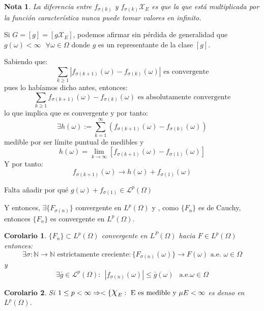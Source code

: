 \documentclass[11pt, a4paper]{article}
\makeatletter
\newif\IfInSansMode
\let\oldsf\sffamily
\renewcommand*{\sffamily}{\oldsf\mathversion{sans}\InSansModetrue}
\let\oldnorm\normalfont
\renewcommand*{\normalfont}{\oldnorm\InSansModefalse\mathversion{normal}}
\DeclareRobustCommand{\rchi}{{\Large \mathpalette\irchi\relax}}
\newcommand{\irchi}[2]{\raisebox{0.4\depth}{$#1\chi$}} %
\renewenvironment{proof}[1][\proofname] {\par\pushQED{\qed}\normalfont\topsep6\p@\@plus6\p@\relax\trivlist\item[\hskip\labelsep\itshape\sffamily#1\@addpunct{.}]\ignorespaces}{\popQED\endtrivlist\@endpefalse}
\theoremstyle{theorem-style}
\newtheorem{ncor}{Corolario}[section]
\theoremstyle{definition-style}
\theoremstyle{remark-style}
\newtheorem*{nota}{Nota}
\theoremstyle{example-style}
\makeatother
\begin{document}
\begin{proof}
  \begin{nota}
    La diferencia entre  $f_{\sigma(k)}$ y $f_{\sigma(k)}\mathcal X _E$ es que la que está multiplicada por la función característica nunca puede tomar valores en infinito.
  \end{nota}
  
  Si $G = [g] = [g \mathcal X _E]$, podemos afirmar sin pérdida de generalidad que $g(\omega) < \infty \ \ \ \forall \omega \in \Omega$ donde $g$ es un representante de la clase $[g]$.
  
  Sabiendo que:
  \[
    \sum_{k \geq 1} |f_{\sigma(k+1)}(\omega) - f_{\sigma(k)}(\omega)| \text{ es convergente}
  \]	
  pues lo habíamos dicho antes, entonces:
  \[
    \sum_{k \geq 1} f_{\sigma(k+1)}(\omega) - f_{\sigma(k)}(\omega) \text{ es absolutamente convergente}
  \]
  lo que implica que es convergente y por tanto:
  \[
    \exists h(\omega):= \sum_{k=1}^\infty (f_{\sigma(k+1)}(\omega) - f_{\sigma(k)}(\omega))
  \]
  medible por ser límite puntual de medibles y 
  \[
    h(\omega) = \lim_{k \to \infty}[f_{\sigma(k+1)}(\omega) -f_{\sigma(1)}(\omega)]
  \]
  Y por tanto:
  \[
    f_{\sigma(k+1)}(\omega) \to h(\omega) + f_{\sigma(1)}(\omega)
  \]
  
  Falta añadir por qué $g(\omega) + f_{\sigma(1)} \in \mathcal L ^p (\Omega)$
  
  
  
  
  Y entonces, $\exists \{ F_{\sigma(n)}\}$ convergente en $L^p(\Omega)$ y , como $\{F_n\}$ es de Cauchy, entonces $\{F_n\}$ es convergente en $L^p(\Omega)$.
\end{proof}


\begin{ncor} \label{jose}
  $\{F_n\} \subset  L ^p (\Omega)$ convergente en $L^P(\Omega)$ hacia $F \in L^p(\Omega)$ entonces:
  \[
    \exists \sigma : \mathbb N \to \mathbb N \text{ estrictamente creciente} : \{F_{\sigma(n)}(\omega)\}\to F(\omega) \text{ a.e. } \omega \in \Omega
  \]
  y
  \[
    \exists \bar g \in \mathcal L ^p (\Omega) : \ \ |f_{\sigma(n)}(\omega)| \leq \bar g (\omega) \ \ \text{ a.e.} \omega \in \Omega
  \]
\end{ncor}

\begin{ncor}
  Si $1 \leq p < \infty \Rightarrow < \{\rchi_{E} : \text{ E es medible y } \mu{E} < \infty$ es denso en $L^{p}(\Omega)$.
\end{ncor}
\end{document}
